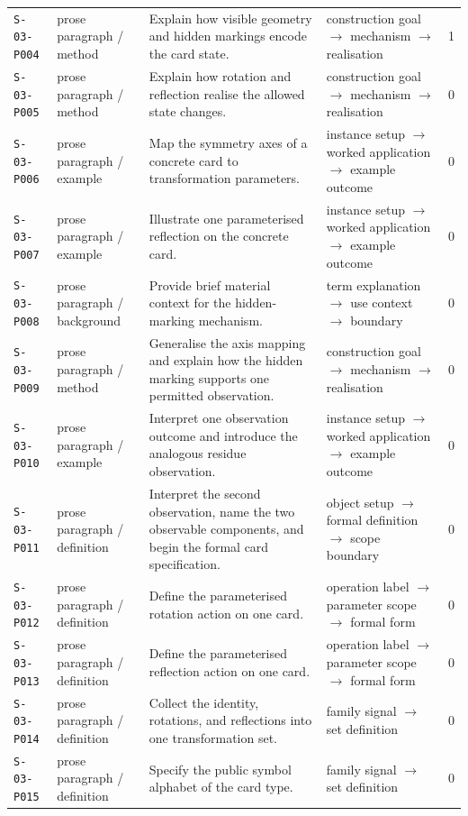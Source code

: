 \documentclass[10pt]{article}
\begin{document}
\begin{longtable}{@{}p{}p{}p{}p{}p{}@{}}
\texttt{S-03-P004}&prose paragraph / method&Explain how visible geometry and hidden markings encode the card state.&construction goal $\rightarrow$ mechanism $\rightarrow$ realisation&1\\
\texttt{S-03-P005}&prose paragraph / method&Explain how rotation and reflection realise the allowed state changes.&construction goal $\rightarrow$ mechanism $\rightarrow$ realisation&0\\
\texttt{S-03-P006}&prose paragraph / example&Map the symmetry axes of a concrete card to transformation parameters.&instance setup $\rightarrow$ worked application $\rightarrow$ example outcome&0\\
\texttt{S-03-P007}&prose paragraph / example&Illustrate one parameterised reflection on the concrete card.&instance setup $\rightarrow$ worked application $\rightarrow$ example outcome&0\\
\texttt{S-03-P008}&prose paragraph / background&Provide brief material context for the hidden-marking mechanism.&term explanation $\rightarrow$ use context $\rightarrow$ boundary&0\\
\texttt{S-03-P009}&prose paragraph / method&Generalise the axis mapping and explain how the hidden marking supports one permitted observation.&construction goal $\rightarrow$ mechanism $\rightarrow$ realisation&0\\
\texttt{S-03-P010}&prose paragraph / example&Interpret one observation outcome and introduce the analogous residue observation.&instance setup $\rightarrow$ worked application $\rightarrow$ example outcome&0\\
\texttt{S-03-P011}&prose paragraph / definition&Interpret the second observation, name the two observable components, and begin the formal card specification.&object setup $\rightarrow$ formal definition $\rightarrow$ scope boundary&0\\
\texttt{S-03-P012}&prose paragraph / definition&Define the parameterised rotation action on one card.&operation label $\rightarrow$ parameter scope $\rightarrow$ formal form&0\\
\texttt{S-03-P013}&prose paragraph / definition&Define the parameterised reflection action on one card.&operation label $\rightarrow$ parameter scope $\rightarrow$ formal form&0\\
\texttt{S-03-P014}&prose paragraph / definition&Collect the identity, rotations, and reflections into one transformation set.&family signal $\rightarrow$ set definition&0\\
\texttt{S-03-P015}&prose paragraph / definition&Specify the public symbol alphabet of the card type.&family signal $\rightarrow$ set definition&0\\

\end{longtable}
\end{document}
